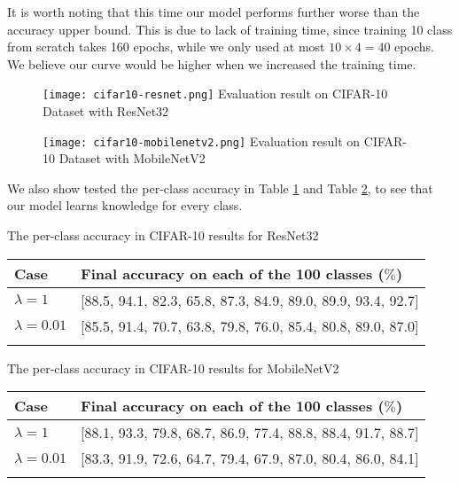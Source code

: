 It is worth noting that this time our model performs further worse than the accuracy upper bound. This is due to lack of training time, since training 10 class from scratch takes 160 epochs, while we only used at most $10 \times 4 = 40$ epochs. We believe our curve would be higher when we increased the training time.
\begin{figure}[!htp]
	\centering
	\texttt{[image: cifar10-resnet.png]}
	{Evaluation result on CIFAR-10 Dataset with ResNet32}
	\label{fig:cifar10-resnet}
\end{figure}
\begin{figure}[!htp]
	\centering
	\texttt{[image: cifar10-mobilenetv2.png]}
	{Evaluation result on CIFAR-10 Dataset with MobileNetV2}
	\label{fig:cifar10-mobilenetv2}
\end{figure}
We also show tested the per-class accuracy in Table \ref{tab:cifar10_resnet} and Table \ref{tab:cifar10_mobilenetv2}, to see that our model learns knowledge for every class.
\begin{table}[!hpb]
	\centering
	{The per-class accuracy in CIFAR-10 results for ResNet32}
	\label{tab:firstone}
	\begin{tabular}{@{}lp{10cm}@{}} \toprule
		Case &  Final accuracy on each of the 100 classes ($\%$)\\ \midrule
		$\lambda=1$  &[88.5, 94.1, 82.3, 65.8, 87.3, 84.9, 89.0, 89.9, 93.4, 92.7]
		\\
		$\lambda=0.01$  & [85.5, 91.4, 70.7, 63.8, 79.8, 76.0, 85.4, 80.8, 89.0, 87.0]\\ \bottomrule
		\label{tab:cifar10_resnet}
	\end{tabular}
\end{table}

\begin{table}[!hpb]
	\centering
	{The per-class accuracy in CIFAR-10 results for MobileNetV2}
	\label{tab:firstone}
	\begin{tabular}{@{}lp{10cm}@{}} \toprule
		Case &  Final accuracy on each of the 100 classes ($\%$)\\ \midrule
		$\lambda=1$  &[88.1, 93.3, 79.8, 68.7, 86.9, 77.4, 88.8, 88.4, 91.7, 88.7]
		
		\\
		$\lambda=0.01$  & [83.3, 91.9, 72.6, 64.7, 79.4, 67.9, 87.0, 80.4, 86.0, 84.1]
		\\ \bottomrule
		\label{tab:cifar10_mobilenetv2}
	\end{tabular}
\end{table}
